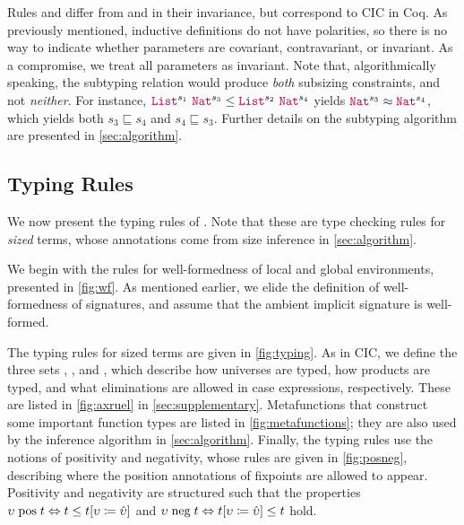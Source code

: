 Rules  and  differ from \CIChat and \CIChatminus in their invariance, but correspond to CIC in Coq.
As previously mentioned, inductive definitions do not have polarities, so there is no way to indicate whether parameters are covariant, contravariant, or invariant.
As a compromise, we treat all parameters as invariant.
Note that, algorithmically speaking, the subtyping relation would produce \textit{both} subsizing constraints, and not \textit{neither}. For instance, $\List^{s_1} ~ \Nat^{s_3} \leq \List^{s_2} ~ \Nat^{s_4}$ yields $\Nat^{s_3} \approx \Nat^{s_4}$, which yields both $s_3 \sqsubseteq s_4$ and $s_4 \sqsubseteq s_3$.
Further details on the subtyping algorithm are presented in \autoref{sec:algorithm}.

\subsection{Typing Rules}\label{sec:typing:rules}

We now present the typing rules of \lang.
Note that these are type checking rules for \textit{sized} terms, whose annotations come from size inference in \autoref{sec:algorithm}.



We begin with the rules for well-formedness of local and global environments, presented in \autoref{fig:wf}.
As mentioned earlier, we elide the definition of well-formedness of signatures,
and assume that the ambient implicit signature is well-formed.







The typing rules for sized terms are given in \autoref{fig:typing}. As in CIC, we define the three sets \Axioms, \Rules, and \Elims, which describe how universes are typed, how products are typed, and what eliminations are allowed in case expressions, respectively.
These are listed in \autoref{fig:axruel} in \autoref{sec:supplementary}.
Metafunctions that construct some important function types are listed in \autoref{fig:metafunctions}; they are also used by the inference algorithm in \autoref{sec:algorithm}.
Finally, the typing rules use the notions of positivity and negativity, whose rules are given in \autoref{fig:posneg}, describing where the position annotations of fixpoints are allowed to appear.
Positivity and negativity are structured such that the properties $\upsilon \mathrel{\text{pos}} t \Leftrightarrow t \leq t [\upsilon \coloneqq \hat{\upsilon}]$ and $\upsilon \mathrel{\text{neg}} t \Leftrightarrow t [\upsilon \coloneqq \hat{\upsilon}] \leq t$ hold.


